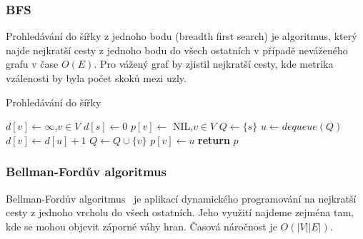 \documentclass{bakalarka}
\begin{document}
\subsubsection{BFS}
Prohledávání do šířky z jednoho bodu (breadth first search) je algoritmus,
který najde nejkratší cesty z jednoho bodu do všech ostatních v případě
neváženého grafu v čase $O(E)$. Pro vážený graf by zjistil nejkratší cesty, kde
metrika vzálenosti by byla počet skoků mezi uzly.

\begin{center}
\begin{minipage}{\textwidth}
\begin{algorithm}[H]
	\caption{Prohledávání do šířky}
		\label{alg:bfs}
	\begin{algorithmic}[1]
	\Statex
		\State $d[v] \gets \infty$,$v \in V$
		\State $d[s] \gets 0$
		\State $p[v] \gets $ NIL,$v \in V$
		\State $Q \gets \{s\}$
			\State $u \gets dequeue(Q)$
					\State $d[v] \gets d[u] + 1$
					\State $Q \gets Q \cup \{v\}$
					\State $p[v] \gets u$
				\EndIf
			\EndFor
		\EndWhile
		\State \textbf{return} $p$
	\EndFunction
	\end{algorithmic}
\end{algorithm}
\end{minipage}
\end{center}
\mbox{}

\subsubsection{Bellman-Fordův algoritmus}
Bellman-Fordův algoritmus~\citep{bellmanford_algorithm} je aplikací dynamického
programování na nejkratší cesty z jednoho vrcholu do všech ostatních. Jeho
využití najdeme zejména tam, kde se mohou objevit záporné váhy hran. Časová
náročnost je $O(|V||E|)$.
\end{document}
